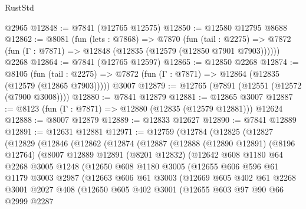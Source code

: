 \begin{lexlean}{RustStd}
\begin{coremodule}
{\begin{coremodule}
{{{{{{{{{{{{{{{{{{{{{{{{{{{{{{{{{{{{{{{{{{{{{{{{{{{{{{    @2965
@12848 := @7841 (@12765 @12575)
@12850 := @12580 @12795 @8688
@12862 := @8081
    (fun (lets : @7868) =>
    @7870
      (fun (tail : @2275) =>
      @7872 (fun (Γ : @7871) => @12848 (@12835 (@12579 (@12850 @7901 @7903))))))
    @2268
@12864 := @7841 (@12765 @12597)
@12865 := @12850 @2268
@12874 := @8105
    (fun (tail : @2275) => @7872 (fun (Γ : @7871) => @12864 (@12835 (@12579 (@12865 @7903)))))
    @3007
@12879 := @12765 (@7891 (@12551 (@12572 (@7900 @3008))))
@12880 := @7841 @12879
@12881 := @12865 @3007
@12887 := @8123 (fun (Γ : @7871) => @12880 (@12835 (@12579 @12881))) @12624
@12888 := @8007 @12879
@12889 := @12833 @12627
@12890 := @7841 @12889
@12891 := @12631 @12881
@12971 := @12759
    (@12784
      (@12825
        (@12827
          (@12829
            (@12846
              (@12862
                (@12874
                  (@12887
                    (@12888
                      (@12890 @12891)
                      (@8196 @12764)
                      (@8007
                        @12889
                        @12891
                        (@8201 @12832)
                        (@12642
                          @608
                          @1180
                          @64
                          @2268
                          @3005
                          @1248
                          (@12650
                            @608
                            @1180
                            @3005
                            (@12655
                              @606
                              @596
                              @61
                              @1179
                              @3003
                              @2987
                              (@12663
                                @606
                                @61
                                @3003
                                (@12669
                                  @605
                                  @402
                                  @61
                                  @2268
                                  @3001
                                  @2027
                                  @408
                                  (@12650
                                    @605
                                    @402
                                    @3001
                                    (@12655
                                      @603
                                      @97
                                      @90
                                      @66
                                      @2999
                                      @2287
}}}}}}}}}}}}}}}}}}}}}}}}}}}}}}}}}}}}}}}}}}}}}}}}}}}}}}
\end{coremodule}}
\end{coremodule}
\end{lexlean}
